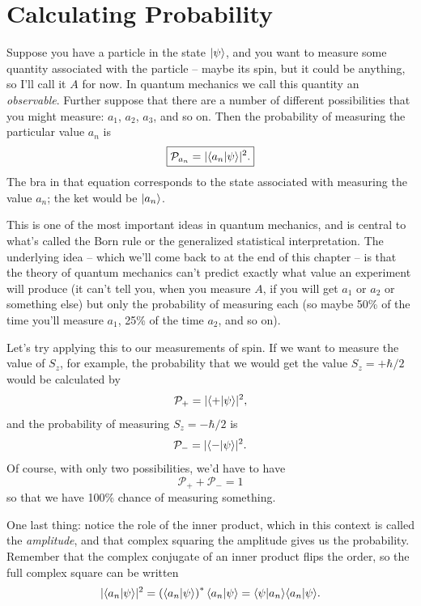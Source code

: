 \section{Calculating Probability}

Suppose you have a particle in the state $| \psi \rangle$, and you want to measure some quantity associated with the particle -- maybe its spin, but it could be anything, so I'll call it $A$ for now.  In quantum mechanics we call this quantity an \emph{observable}.  Further suppose that there are a number of different possibilities that you might measure: $a_1$, $a_2$, $a_3$, and so on. Then the probability of measuring the particular value $a_n$ is
\begin{equation}
\boxed{
\mathcal{P}_{a_n} = | \langle a_n | \psi \rangle |^2.
}
\end{equation}
The bra in that equation corresponds to the state associated with measuring the value $a_n$; the ket would be $| a_n \rangle$.  

This is one of the most important ideas in quantum mechanics, and is central to what's called the Born rule or the generalized statistical interpretation.  The underlying idea -- which we'll come back to at the end of this chapter -- is that the theory of quantum mechanics can't predict exactly what value an experiment will produce (it can't tell you, when you measure $A$, if you will get $a_1$ or $a_2$ or something else) but only the probability of measuring each (so maybe 50\% of the time you'll measure $a_1$, 25\% of the time $a_2$, and so on). 

Let's try applying this to our measurements of spin.  If we want to measure the value of $S_z$, for example, the probability that we would get the value $S_z = +\hbar/2$ would be calculated by
\[
\mathcal{P}_+ = |\langle + | \psi \rangle|^2,
\]
and the probability of measuring $S_z = -\hbar/2$ is
\[
\mathcal{P}_- = |\langle - | \psi \rangle|^2.
\]
Of course, with only two possibilities, we'd have to have
\[
\mathcal{P}_+ + \mathcal{P}_- = 1
\]
so that we have 100\% chance of measuring something.

One last thing:  notice the role of the inner product, which in this context is called the \emph{amplitude}, and that complex squaring the amplitude gives us the probability.  Remember that the complex conjugate of an inner product flips the order, so the full complex square can be written 
\begin{equation}
| \langle a_n | \psi \rangle |^2 = \left( \langle a_n | \psi \rangle \right)^* \langle a_n | \psi \rangle  = \langle \psi | a_n \rangle \langle a_n | \psi \rangle. 
\end{equation}

